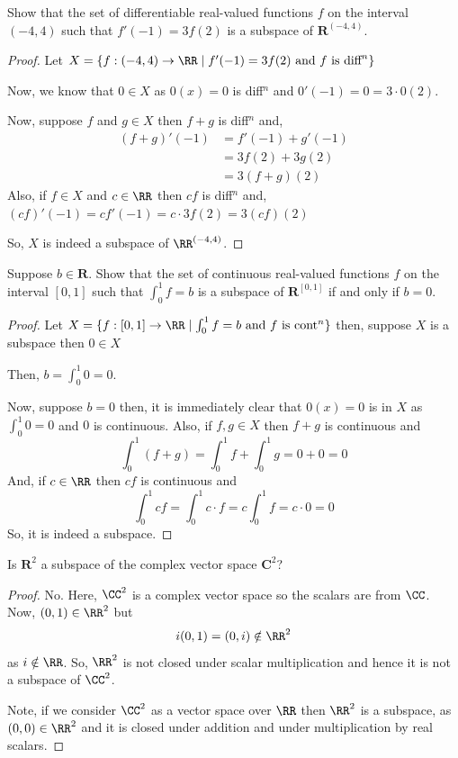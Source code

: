 \begin{exercise}
Show that the set of differentiable real-valued functions $f$ on the interval $(-4, 4)$ such that $f'(-1) = 3f(2)$ is a subspace of $\mathbf{R}^{(-4,4)}$.
\end{exercise}

\begin{proof}
Let $X = \{f : (-4,4) \to \RR \mid f'(-1) = 3f(2) \text{ and } f \text{ is diff}^n\}$

Now, we know that $0 \in X$ as $0(x) = 0$ is diff$^n$ and $0'(-1) = 0 = 3 \cdot 0(2)$.

Now, suppose $f$ and $g \in X$ then $f+g$ is diff$^n$ and,
\begin{align*}
(f+g)'(-1) &= f'(-1) + g'(-1) \\
&= 3f(2) + 3g(2) \\
&= 3(f+g)(2)
\end{align*}
Also, if $f \in X$ and $c \in \RR$ then $cf$ is diff$^n$ and, $(cf)'(-1) = c f'(-1) = c \cdot 3f(2) = 3(cf)(2)$

So, $X$ is indeed a subspace of $\RR^{(-4,4)}$.
\end{proof}

\begin{exercise}
Suppose $b \in \mathbf{R}$. Show that the set of continuous real-valued functions $f$ on the interval $[0, 1]$ such that $\int_0^1 f = b$ is a subspace of $\mathbf{R}^{[0,1]}$ if and only if $b = 0$.
\end{exercise}

\begin{proof}
Let $X = \{f : [0,1] \to \RR \mid \int_0^1 f = b \text{ and } f \text{ is cont}^n\}$ then, suppose $X$ is a subspace then $0 \in X$

Then, $b = \int_0^1 0 = 0$.

Now, suppose $b = 0$ then, it is immediately clear that $0(x) = 0$ is in $X$ as $\int_0^1 0 = 0$ and $0$ is continuous. Also, if $f, g \in X$ then $f+g$ is continuous and
\[
\int_0^1 (f+g) = \int_0^1 f + \int_0^1 g = 0 + 0 = 0
\]
And, if $c \in \RR$ then $cf$ is continuous and
\[
\int_0^1 cf = \int_0^1 c \cdot f = c \int_0^1 f = c \cdot 0 = 0
\]
So, it is indeed a subspace.
\end{proof}

\begin{exercise}
Is $\mathbf{R}^2$ a subspace of the complex vector space $\mathbf{C}^2$?
\end{exercise}

\begin{proof}
No. Here, $\CC^2$ is a complex vector space so the scalars are from $\CC$. Now, $(0,1) \in \RR^2$ but
\[
i(0,1) = (0,i) \notin \RR^2
\]
as $i \notin \RR$. So, $\RR^2$ is not closed under scalar multiplication and hence it is not a subspace of $\CC^2$.

Note, if we consider $\CC^2$ as a vector space over $\RR$ then $\RR^2$ is a subspace, as $(0,0) \in \RR^2$ and it is closed under addition and under multiplication by real scalars.
\end{proof}

